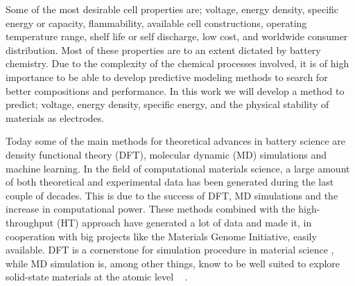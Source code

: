 Some of the most desirable cell properties are; voltage, energy density, specific energy or capacity, flammability, available cell constructions, operating temperature range, shelf life or self discharge, low cost, and worldwide consumer distribution. Most of these properties are to an extent dictated by battery chemistry. Due to the complexity of the chemical processes involved, it is of high importance to be able to develop predictive modeling methods to search for better compositions and performance. In this work we will develop a method to predict; voltage, energy density, specific energy, and the physical stability of materials as electrodes.





Today some of the main methods for theoretical advances in battery science are density functional theory (\ac{DFT}), molecular dynamic (\ac{MD}) simulations and machine learning. In the field of computational materials science, a large amount of both theoretical and experimental data has been generated during the last couple of decades. This is due to the success of DFT, MD simulations and the increase in computational power. These methods combined with the high-throughput (\ac{HT}) approach have generated a lot of data and made it, in cooperation with big projects like the Materials Genome Initiative, easily available. DFT is a cornerstone for simulation procedure in material science \cite{schleder2019dft} \cite{pour2011structural} \cite{kirklin2013high}, while MD simulation is, among other things, know to be well suited to explore solid-state materials at the atomic level \cite{kaneko2003local} \cite{ammundsen1999lattice} \cite{islam2000atomistic} \cite{braithwaite2000computational}. 



